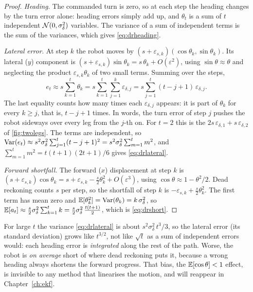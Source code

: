 \begin{proof}
\emph{Heading.} The commanded turn is zero, so at each step the heading
changes by the turn error alone: heading errors simply add up, and
$\theta_t$ is a sum of $t$ independent $\mathcal{N}(0,\sigma_\delta^2)$
variables. The variance of a sum of independent terms is the sum of the
variances, which gives \eqref{eq:drheading}.

\emph{Lateral error.} At step $k$ the robot moves by
$(s+\varepsilon_{s,k})(\cos\theta_k,\sin\theta_k)$. Its lateral ($y$)
component is $(s+\varepsilon_{s,k})\sin\theta_k=s\,\theta_k+O(\varepsilon^2)$,
using $\sin\theta\approx\theta$ and neglecting the product
$\varepsilon_{s,k}\theta_k$ of two small terms. Summing over the steps,
\[
  e_t\approx s\sum_{k=1}^t\theta_k
  =s\sum_{k=1}^t\sum_{j=1}^k\varepsilon_{\delta,j}
  =s\sum_{j=1}^t(t-j+1)\,\varepsilon_{\delta,j}.
\]
The last equality counts how many times each $\varepsilon_{\delta,j}$
appears: it is part of $\theta_k$ for every $k\ge j$, that is, $t-j+1$
times. In words, the turn error of step $j$ pushes the robot sideways over
every leg from the $j$-th on. For $t=2$ this is the
$2s\,\varepsilon_{\delta,1}+s\,\varepsilon_{\delta,2}$ of
\cref{fig:twolegs}. The terms are independent, so
$\operatorname{Var}(e_t)\approx s^2\sigma_\delta^2\sum_{j=1}^t(t-j+1)^2
=s^2\sigma_\delta^2\sum_{m=1}^t m^2$, and
$\sum_{m=1}^tm^2=t(t+1)(2t+1)/6$ gives \eqref{eq:drlateral}.

\emph{Forward shortfall.} The forward ($x$) displacement at step $k$ is
$(s+\varepsilon_{s,k})\cos\theta_k=s+\varepsilon_{s,k}-\tfrac s2\theta_k^2
+O(\varepsilon^3)$, using $\cos\theta\approx1-\theta^2/2$. Dead reckoning
counts $s$ per step, so the shortfall of step $k$ is
$-\varepsilon_{s,k}+\tfrac s2\theta_k^2$. The first term has mean zero and
$\mathbb{E}[\theta_k^2]=\operatorname{Var}(\theta_k)=k\,\sigma_\delta^2$, so
$\mathbb{E}[a_t]\approx\tfrac s2\sigma_\delta^2\sum_{k=1}^tk
=\tfrac s2\sigma_\delta^2\,\tfrac{t(t+1)}2$, which is \eqref{eq:drshort}.
\end{proof}

\begin{inwords}
For large $t$ the variance \eqref{eq:drlateral} is about
$s^2\sigma_\delta^2\,t^3/3$, so the lateral error (its standard deviation)
grows like $t^{3/2}$, not like $\sqrt t$ as a sum of independent errors
would: each heading error is \emph{integrated} along the rest of the path. Worse, the robot is
\emph{on average} short of where dead reckoning puts it, because a wrong
heading always shortens the forward progress. That bias, the
$\mathbb{E}[\cos\theta]<1$ effect, is invisible to any method that linearises the
motion, and will reappear in Chapter~\ref{ch:ekf}.
\end{inwords}

